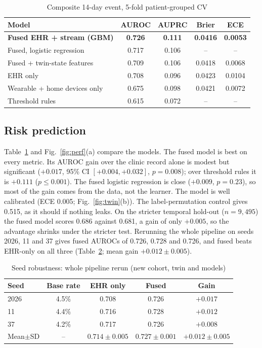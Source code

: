 \documentclass[conference]{IEEEtran}
\begin{document}
\begin{table}[H]
\caption{Composite 14-day event, 5-fold patient-grouped CV}
\label{tab:models}
\centering
\footnotesize
\begin{tabular}{@{}lcccc@{}}
\toprule
Model & AUROC & AUPRC & Brier & ECE\\
\midrule
\textbf{Fused EHR + stream (GBM)} & \textbf{0.726} & \textbf{0.111} & \textbf{0.0416} & \textbf{0.0053}\\
Fused, logistic regression & 0.717 & 0.106 & -- & --\\
Fused + twin-state features & 0.709 & 0.106 & 0.0418 & 0.0068\\
EHR only & 0.708 & 0.096 & 0.0423 & 0.0104\\
Wearable + home devices only & 0.675 & 0.098 & 0.0421 & 0.0072\\
Threshold rules & 0.615 & 0.072 & -- & --\\
\bottomrule
\end{tabular}
\end{table}

\subsection{Risk prediction} Table~\ref{tab:models} and Fig.~\ref{fig:perf}(a) compare the models. The fused model is best on every metric. Its AUROC gain over the clinic record alone is modest but significant ($+0.017$, 95\% CI $[+0.004,+0.032]$, $p=0.008$); over threshold rules it is $+0.111$ ($p\le0.001$). The fused logistic regression is close ($+0.009$, $p=0.23$), so most of the gain comes from the data, not the learner. The model is well calibrated (ECE 0.005; Fig.~\ref{fig:twin}(b)). The label-permutation control gives 0.515, as it should if nothing leaks. On the stricter temporal hold-out ($n=9{,}495$) the fused model scores 0.686 against 0.681, a gain of only $+0.005$, so the advantage shrinks under the stricter test. Rerunning the whole pipeline on seeds 2026, 11 and 37 gives fused AUROCs of 0.726, 0.728 and 0.726, and fused beats EHR-only on all three (Table~\ref{tab:seeds}; mean gain $+0.012\pm0.005$).

\begin{table}[H]
\caption{Seed robustness: whole pipeline rerun (new cohort, twin and models)}
\label{tab:seeds}
\centering
\footnotesize
\setlength{\tabcolsep}{4pt}
\begin{tabular}{@{}lcccc@{}}
\toprule
Seed & Base rate & EHR only & Fused & Gain\\
\midrule
2026 & 4.5\% & 0.708 & 0.726 & $+0.017$\\
11 & 4.4\% & 0.716 & 0.728 & $+0.012$\\
37 & 4.2\% & 0.717 & 0.726 & $+0.008$\\
\midrule
Mean$\pm$SD & -- & $0.714\pm0.005$ & $0.727\pm0.001$ & $+0.012\pm0.005$\\
\bottomrule
\end{tabular}
\end{table}
\end{document}
